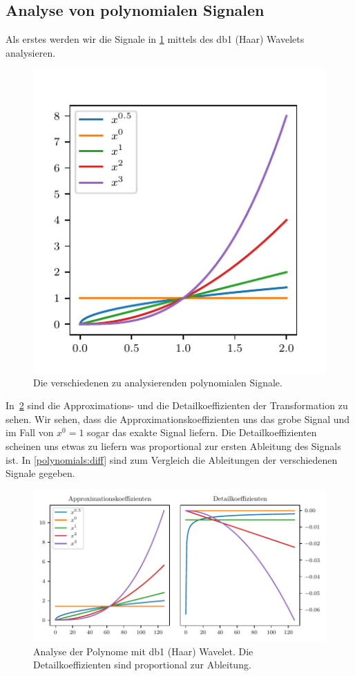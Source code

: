 \begin{refsection}
\section{Analyse von polynomialen Signalen}

Als erstes werden wir die Signale in \cref{polynomials:signals} mittels des db1
(Haar) Wavelets analysieren.
\begin{figure}
    \centering
    \includegraphics{papers/polynomials/images/polynomials_signals.pdf}
    \caption{Die verschiedenen zu analysierenden polynomialen Signale.\label{polynomials:signals}}
\end{figure}
In~\cref{polynomials:haar} sind die Approximations- und die Detailkoeffizienten
der Transformation zu sehen. Wir sehen, dass die Approximationskoeffizienten
uns das grobe Signal und im Fall von $x^0 = 1$ sogar das exakte Signal liefern.
Die Detailkoeffizienten scheinen uns etwas zu liefern was proportional zur
ersten Ableitung des Signals ist. In \cref{polynomials:diff} sind zum Vergleich
die Ableitungen der verschiedenen Signale gegeben.

\begin{figure}
    \centering
    \includegraphics{papers/polynomials/images/polynomials_signals_db1.pdf}
    \caption{Analyse der Polynome mit db1 (Haar) Wavelet. Die
             Detailkoeffizienten sind proportional zur
             Ableitung.\label{polynomials:haar}}
\end{figure}


\end{refsection}
